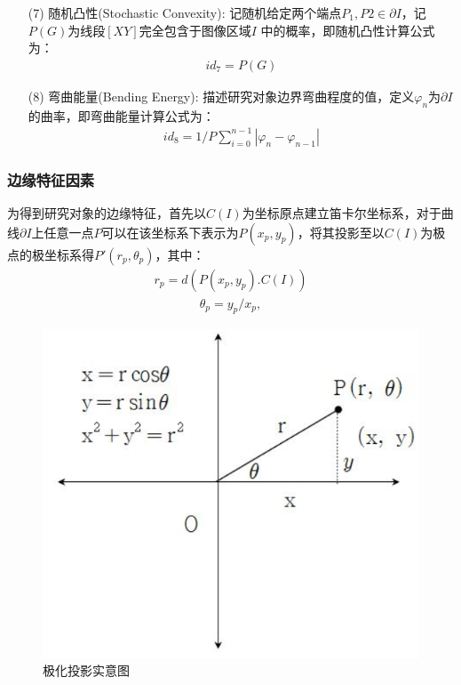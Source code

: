 \documentclass{whutmod}
\begin{document}
\begin{itemize}
		\item[(7)]随机凸性(Stochastic Convexity):
		记随机给定两个端点$P_{1},P{2}\in\partial I$，记$P(G)$为线段$[XY]$完全包含于图像区域$I$ 中的概率，即随机凸性计算公式为：
		\begin{gather}
		id_{7}=P(G)
		\end{gather}
		
		\item[(8)]弯曲能量(Bending Energy):
		描述研究对象边界弯曲程度的值，定义$\varphi _{n}$为$\partial I$的曲率，即弯曲能量计算公式为：
		\begin{gather}	
		id_{8}= 1 / P \sum _ { i = 0 } ^ { n - 1 } \left|\varphi _{n} -\varphi _{n-1}\right|
		\end{gather}
		
		
		
		
		
		\end{itemize}	

	

		\subsubsection{边缘特征因素}
		为得到研究对象的边缘特征，首先以$C(I)$为坐标原点建立笛卡尔坐标系，对于曲线$\partial I$上任意一点$P$可以在该坐标系下表示为$P(x_{p},y_{p})$，将其投影至以$C(I)$为极点的极坐标系得${P}'(r_{p},\theta _{p})$，其中：
		\begin{gather}
		r_{p}=d(P(x_{p},y_{p}).C(I))
		\end{gather}
		\begin{gather}
		\theta _{p}=y_{p}/x_{p},
		\end{gather}
		
	  \begin{figure}[H]
		\centering
		\includegraphics[width=.6\textwidth]{figures/jihua.png}
		\caption{极化投影实意图}\label{66}
	\end{figure}
		
\end{document}
